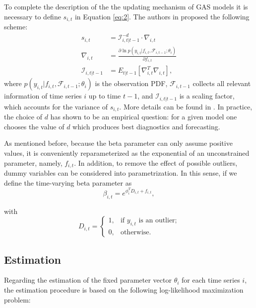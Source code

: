 \documentclass[a4paper]{IEEEtran}
\begin{document}
To complete the description of the the updating mechanism of GAS models it is necessary to define $s_{i,t}$ in  Equation \eqref{eq:2}. The authors in \cite{creal2013generalized} proposed the following scheme:
\begin{align}
s_{i,t} &= \mathcal{I}_{i,t|t-1}^{-d} \cdot \nabla_{i,t}\label{eq:score1}\\
\nabla_{i,t} &= \frac{\partial \ln p(y_{i,t}|f_{i,t},\mathcal{F}_{i,t-1};\theta_i)}{\partial f_{i,t}}\label{eq:score2}\\
\mathcal{I}_{i,t|t-1} &= E_{t|t-1}[\nabla_{i,t}^{T}\nabla_{i,t}],\label{eq:score3} 
\end{align}
\noindent
where $p(y_{i,t}|f_{i,t},\mathcal{F}_{i,t-1};\theta_i)$ is the observation PDF, $\mathcal{F}_{i,t-1}$ collects all relevant information of time series $i$ up to time $t-1$, and $\mathcal{I}_{i,t|t-1}$ is a scaling factor, which accounts for the variance of $s_{i,t}$. More details can be found in \cite{creal2013generalized}. In practice, the choice of $d$ has shown to be an empirical question: for a given model one chooses the value of $d$ which produces best diagnostics and forecasting.

As mentioned before, because the beta parameter can only assume positive values, it is conveniently reparameterized as the exponential of an unconstrained parameter, namely, $f_{i,t}$. In addition, to remove the effect of possible outliers, dummy variables can be considered into parametrization. In this sense, if we define the time-varying beta parameter as 
\begin{equation}
\beta_{i,t} = e^{\phi_i^T D_{i,t} + f_{i,t}}, \label{eq:exogena}
\end{equation}

\noindent
with
\begin{equation}
D_{i,t}=
\begin{cases}
1 , & \text{if } y_{i,t} \text{ is an outlier;} \\
0,  & \text{otherwise}.
\end{cases}
\end{equation}

\subsection{Estimation} \label{MVunivariado}

Regarding the estimation of the fixed parameter vector $\theta_i$ for each time series $i$, the estimation procedure is based on the following log-likelihood maximization problem:%
\end{document}
